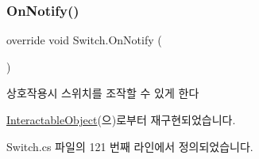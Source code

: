 \subsubsection{\texorpdfstring{OnNotify()}{OnNotify()}}
{\footnotesize\ttfamily override void Switch.\+On\+Notify (\begin{DoxyParamCaption}{ }\end{DoxyParamCaption})\hspace{0.3cm}{\ttfamily [virtual]}}



상호작용시 스위치를 조작할 수 있게 한다 



\mbox{\hyperlink{class_interactable_object_aa5c752d17471fe0daf58a4d00c218a29}{Interactable\+Object}}(으)로부터 재구현되었습니다.



Switch.\+cs 파일의 121 번째 라인에서 정의되었습니다.


